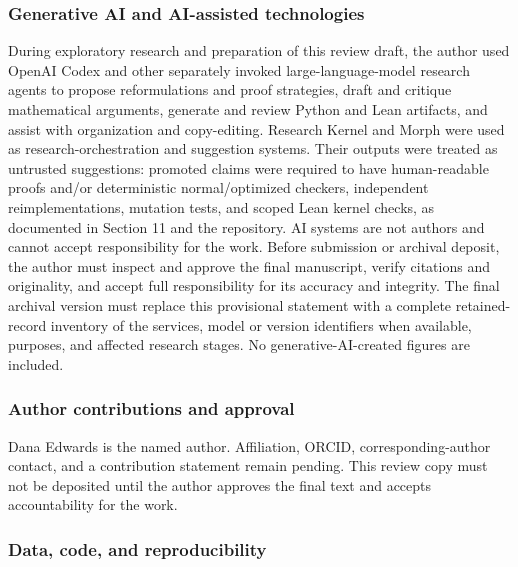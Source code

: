 \documentclass[
  11pt,
]{article}
\theoremstyle{definition}
\theoremstyle{remark}
\begin{document}
\hypertarget{generative-ai-and-ai-assisted-technologies}{%
\subsubsection*{Generative AI and AI-assisted
technologies}\label{generative-ai-and-ai-assisted-technologies}}

During exploratory research and preparation of this review draft, the
author used OpenAI Codex and other separately invoked
large-language-model research agents to propose reformulations and proof
strategies, draft and critique mathematical arguments, generate and
review Python and Lean artifacts, and assist with organization and
copy-editing. Research Kernel and Morph were used as
research-orchestration and suggestion systems. Their outputs were
treated as untrusted suggestions: promoted claims were required to have
human-readable proofs and/or deterministic normal/optimized checkers,
independent reimplementations, mutation tests, and scoped Lean kernel
checks, as documented in Section 11 and the repository. AI systems are
not authors and cannot accept responsibility for the work. Before
submission or archival deposit, the author must inspect and approve the
final manuscript, verify citations and originality, and accept full
responsibility for its accuracy and integrity. The final archival
version must replace this provisional statement with a complete
retained-record inventory of the services, model or version identifiers
when available, purposes, and affected research stages. No
generative-AI-created figures are included.

\hypertarget{author-contributions-and-approval}{%
\subsubsection*{Author contributions and
approval}\label{author-contributions-and-approval}}

Dana Edwards is the named author. Affiliation, ORCID,
corresponding-author contact, and a contribution statement remain
pending. This review copy must not be deposited until the author
approves the final text and accepts accountability for the work.

\hypertarget{data-code-and-reproducibility}{%
\subsubsection*{Data, code, and
reproducibility}\label{data-code-and-reproducibility}}
\end{document}
